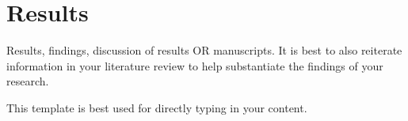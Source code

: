 \chapter{Results} \label{chapterResults}


Results, findings, discussion of results OR manuscripts.  It is best to also reiterate information in your literature review to help substantiate the findings of your research.

This template is best used for directly typing in your content. 
